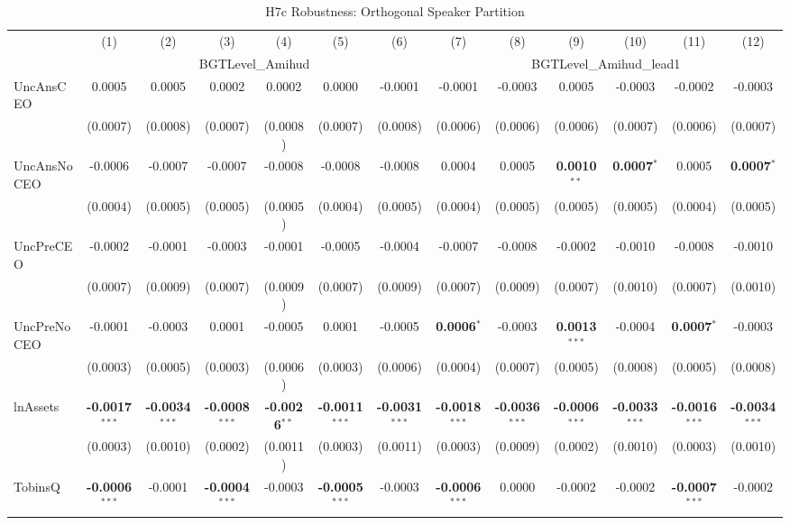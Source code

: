 \documentclass[11pt,a4paper]{article}
\begin{document}
\begin{table}[htbp]
\centering
\caption{H7c Robustness: Orthogonal Speaker Partition}
\label{tab:h7c_robust}
\scriptsize
\begin{tabular}{lcccccccccccc}
\toprule
 & (1) & (2) & (3) & (4) & (5) & (6) & (7) & (8) & (9) & (10) & (11) & (12) \\
 & \multicolumn{6}{c}{BGTLevel\_Amihud} & \multicolumn{6}{c}{BGTLevel\_Amihud\_lead1} \\
\cmidrule(lr){2-7} \cmidrule(lr){8-13}
\midrule
UncAnsCEO & 0.0005 & 0.0005 & 0.0002 & 0.0002 & 0.0000 & -0.0001 & -0.0001 & -0.0003 & 0.0005 & -0.0003 & -0.0002 & -0.0003 \\
 & (0.0007) & (0.0008) & (0.0007) & (0.0008) & (0.0007) & (0.0008) & (0.0006) & (0.0006) & (0.0006) & (0.0007) & (0.0006) & (0.0007) \\
UncAnsNoCEO & -0.0006 & -0.0007 & -0.0007 & -0.0008 & -0.0008 & -0.0008 & 0.0004 & 0.0005 & \textbf{0.0010}$^{**}$ & \textbf{0.0007}$^{*}$ & 0.0005 & \textbf{0.0007}$^{*}$ \\
 & (0.0004) & (0.0005) & (0.0005) & (0.0005) & (0.0004) & (0.0005) & (0.0004) & (0.0005) & (0.0005) & (0.0005) & (0.0004) & (0.0005) \\
UncPreCEO & -0.0002 & -0.0001 & -0.0003 & -0.0001 & -0.0005 & -0.0004 & -0.0007 & -0.0008 & -0.0002 & -0.0010 & -0.0008 & -0.0010 \\
 & (0.0007) & (0.0009) & (0.0007) & (0.0009) & (0.0007) & (0.0009) & (0.0007) & (0.0009) & (0.0007) & (0.0010) & (0.0007) & (0.0010) \\
UncPreNoCEO & -0.0001 & -0.0003 & 0.0001 & -0.0005 & 0.0001 & -0.0005 & \textbf{0.0006}$^{*}$ & -0.0003 & \textbf{0.0013}$^{***}$ & -0.0004 & \textbf{0.0007}$^{*}$ & -0.0003 \\
 & (0.0003) & (0.0005) & (0.0003) & (0.0006) & (0.0003) & (0.0006) & (0.0004) & (0.0007) & (0.0005) & (0.0008) & (0.0005) & (0.0008) \\
\midrule
lnAssets & \textbf{-0.0017}$^{***}$ & \textbf{-0.0034}$^{***}$ & \textbf{-0.0008}$^{***}$ & \textbf{-0.0026}$^{**}$ & \textbf{-0.0011}$^{***}$ & \textbf{-0.0031}$^{***}$ & \textbf{-0.0018}$^{***}$ & \textbf{-0.0036}$^{***}$ & \textbf{-0.0006}$^{***}$ & \textbf{-0.0033}$^{***}$ & \textbf{-0.0016}$^{***}$ & \textbf{-0.0034}$^{***}$ \\
 & (0.0003) & (0.0010) & (0.0002) & (0.0011) & (0.0003) & (0.0011) & (0.0003) & (0.0009) & (0.0002) & (0.0010) & (0.0003) & (0.0010) \\
TobinsQ & \textbf{-0.0006}$^{***}$ & -0.0001 & \textbf{-0.0004}$^{***}$ & -0.0003 & \textbf{-0.0005}$^{***}$ & -0.0003 & \textbf{-0.0006}$^{***}$ & 0.0000 & -0.0002 & -0.0002 & \textbf{-0.0007}$^{***}$ & -0.0002 \\

\end{tabular}
\end{table}
\end{document}
